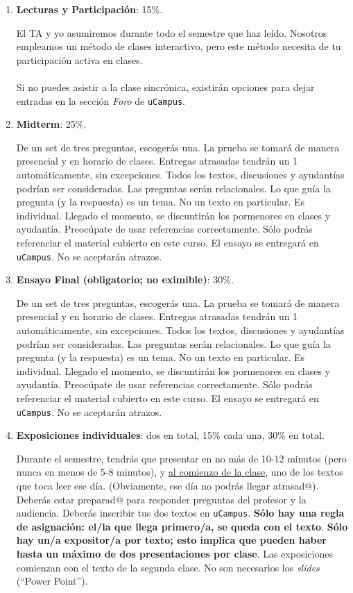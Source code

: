 \documentclass[letterpaper]{article}
\begin{document}
\begin{enumerate}

	\item {\bf Lecturas y Participaci\'on}: 15\%.

		El TA y yo asumiremos durante todo el semestre que haz le\'ido. Nosotros empleamos un m\'etodo de clases interactivo, pero este m\'etodo necesita de tu participaci\'on activa en clases.
		\\
		\\	
		Si no puedes asistir a la clase sincr\'onica, existir\'an opciones para dejar entradas en la secci\'on \emph{Foro} de \texttt{uCampus}.
	
  \item {\bf Midterm}: 25\%.

		De un set de tres preguntas, escoger\'as una. La prueba se tomar\'a de manera presencial y en horario de clases. Entregas atrasadas tendr\'an un 1 autom\'aticamente, sin excepciones. Todos los textos, discusiones y ayudant\'ias podr\'ian ser consideradas. Las preguntas ser\'an relacionales. Lo que gu\'ia la pregunta (y la respuesta) es un tema. No un texto en particular. Es individual. Llegado el momento, se discuntir\'an los pormenores en clases y ayudant\'ia. Preoc\'upate de usar referencias correctamente. S\'olo podr\'as referenciar el material cubierto en este curso. El ensayo se entregar\'a en \texttt{uCampus}. No se aceptar\'an atrazos.

	\item {\bf Ensayo Final (obligatorio; no eximible)}: 30\%. 

	   De un set de tres preguntas, escoger\'as una. La prueba se tomar\'a de manera presencial y en horario de clases. Entregas atrasadas tendr\'an un 1 autom\'aticamente, sin excepciones. Todos los textos, discusiones y ayudant\'ias podr\'ian ser consideradas. Las preguntas ser\'an relacionales. Lo que gu\'ia la pregunta (y la respuesta) es un tema. No un texto en particular. Es individual. Llegado el momento, se discuntir\'an los pormenores en clases y ayudant\'ia. Preoc\'upate de usar referencias correctamente. S\'olo podr\'as referenciar el material cubierto en este curso. El ensayo se entregar\'a en \texttt{uCampus}. No se aceptar\'an atrazos.

	\item {\bf Exposiciones individuales}: dos en total, 15\% cada una, 30\% en total.

	Durante el semestre, tendr\'as que presentar en no m\'as de 10-12 minutos (pero nunca en menos de 5-8 minutos), y \underline{al comienzo de la clase}, uno de los textos que toca leer ese d\'ia. (Obviamente, ese d\'ia no podr\'as llegar atrasad$@$). Deber\'as estar preparad$@$ para responder preguntas del profesor y la audiencia. Deber\'as inscribir tus dos textos en \texttt{uCampus}. {\bf S\'olo hay una regla de asignaci\'on: el/la que llega primero/a, se queda con el texto}. {\bf S\'olo hay un/a expositor/a por texto; esto implica que pueden haber hasta un m\'aximo de dos presentaciones por clase}. Las exposiciones comienzan con el texto de la segunda clase. No son necesarios los \emph{slides} (``Power Point''). 


\end{enumerate}
\end{document}
